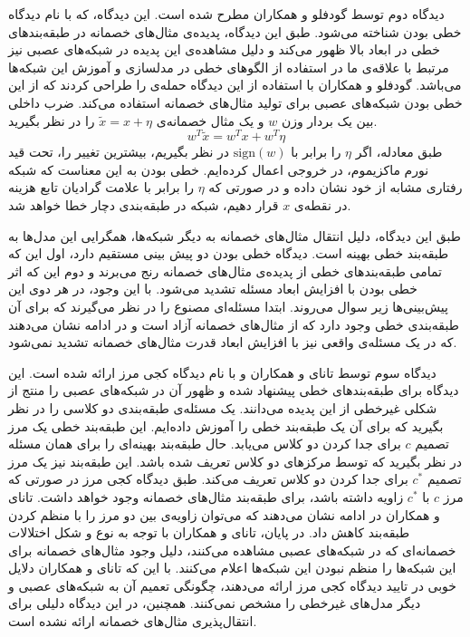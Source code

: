 \documentclass[12pt,onecolumn,a4paper]{article}
\begin{document}
دیدگاه دوم توسط گودفلو و همکاران\cite{goodfellow2014explaining}
مطرح شده است. این دیدگاه، که با نام دیدگاه خطی بودن شناخته می‌شود. طبق این دیدگاه، پدیده‌ی مثال‌های خصمانه در طبقه‌بندهای خطی در ابعاد بالا ظهور می‌کند و دلیل مشاهده‌ی این پدیده در شبکه‌های عصبی نیز مرتبط با علاقه‌ی ما در استفاده از الگوهای خطی در مدلسازی و آموزش این شبکه‌ها می‌باشد. گودفلو و همکاران با استفاده از این دیدگاه حمله‌ی
را طراحی کردند که از این خطی بودن شبکه‌های عصبی برای تولید مثال‌های خصمانه استفاده می‌کند. ضرب داخلی بین یک بردار وزن $w$ و یک مثال خصمانه‌ی $\tilde{x}=x+\eta$ را در نظر بگیرید.
\begin{equation*}
w^T\tilde{x}=w^Tx+w^T\eta
\end{equation*}
طبق معادله، اگر $\eta$ را برابر با $\mathrm{sign}(w)$ در نظر بگیریم، بیشترین تغییر را، تحت قید نورم ماکزیموم، در خروجی اعمال کرده‌ایم. خطی بودن به این معناست که شبکه رفتاری مشابه از خود نشان داده و در صورتی که $\eta$ را برابر با علامت گرادیان تابع هزینه در نقطه‌ی $x$ قرار دهیم، شبکه در طبقه‌بندی دچار خطا خواهد شد.

طبق این دیدگاه، دلیل انتقال مثال‌های خصمانه به دیگر شبکه‌ها، همگرایی این مدل‌ها به طبقه‌بند خطی بهینه است. دیدگاه خطی بودن دو پیش بینی مستقیم دارد، اول این که تمامی طبقه‌بندهای خطی از پدیده‌ی مثال‌های خصمانه رنج می‌برند و دوم این که اثر خطی بودن با افزایش ابعاد مسئله تشدید می‌شود. با این وجود، در
\cite{tanay2016boundary}
هر دوی این پیش‌بینی‌ها زیر سوال می‌روند. ابتدا مسئله‌ای  مصنوع را در نظر می‌گیرند که برای آن طبقه‌بندی خطی وجود دارد که از مثال‌های خصمانه آزاد است و در ادامه نشان می‌دهند که در یک مسئله‌ی واقعی نیز با افزایش ابعاد قدرت مثال‌های خصمانه تشدید نمی‌شود.

دیدگاه سوم توسط تانای و همکاران
\cite{tanay2016boundary}
 و با نام دیدگاه کجی مرز ارائه شده است. این دیدگاه برای طبقه‌بندهای خطی پیشنهاد شده و ظهور آن در شبکه‌های عصبی را منتج از شکلی غیرخطی از این پدیده می‌دانند. یک مسئله‌ی طبقه‌بندی دو کلاسی را در نظر بگیرید که برای آن یک طبقه‌بند خطی را آموزش داده‌ایم. این طبقه‌بند خطی یک مرز تصمیم
 $c$
 برای جدا کردن دو کلاس می‌یابد. حال طبقه‌بند بهینه‌ای را برای همان مسئله در نظر بگیرید که توسط مرکزهای دو کلاس تعریف شده باشد. این طبقه‌بند نیز یک مرز تصمیم
 $c^*$
 برای جدا کردن دو کلاس تعریف می‌کند. طبق دیدگاه کجی مرز در صورتی که مرز
 $c$
 با
 $c^*$
 زاویه داشته باشد، برای طبقه‌بند مثال‌های خصمانه وجود خواهد داشت. تانای و همکاران در ادامه نشان می‌دهند که می‌توان زاویه‌ی بین دو مرز را با منظم کردن
طبقه‌بند کاهش داد. در پایان، تانای و همکاران با توجه به نوع و شکل اختلالات خصمانه‌ای که در شبکه‌های عصبی مشاهده می‌کنند، دلیل وجود مثال‌های خصمانه برای این شبکه‌ها را منظم نبودن این شبکه‌ها اعلام می‌کنند. با این که تانای و همکاران دلایل خوبی در تایید دیدگاه کجی مرز ارائه می‌دهند، چگونگی تعمیم آن به شبکه‌های عصبی و دیگر مدل‌های غیرخطی را مشخص نمی‌کنند. همچنین، در این دیدگاه دلیلی برای انتقال‌پذیری مثال‌های خصمانه ارائه نشده است.
\end{document}
